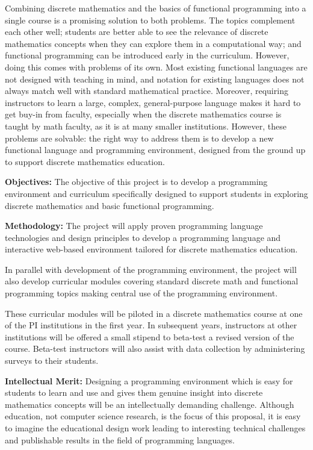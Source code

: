 Combining discrete mathematics and the basics of functional
programming into a single course is a promising solution to both
problems.  The topics complement each other well; students are better
able to see the relevance of discrete mathematics concepts when they
can explore them in a computational way; and functional programming
can be introduced early in the curriculum.  However, doing this comes
with problems of its own. Most existing functional languages are not
designed with teaching in mind, and notation for existing languages
does not always match well with standard mathematical practice.
Moreover, requiring instructors to learn a large, complex,
general-purpose language makes it hard to get buy-in from faculty,
especially when the discrete mathematics course is taught by math
faculty, as it is at many smaller institutions. However, these
problems are solvable: the right way to address them is to develop a
new functional language and programming environment, designed from the
ground up to support discrete mathematics education.

{\bf Objectives: } The objective of this project is to develop a
programming environment and curriculum specifically designed to
support students in exploring discrete mathematics and basic
functional programming.

{\bf Methodology: } The project will apply proven programming language
technologies and design principles to develop a programming language
and interactive web-based environment tailored for discrete
mathematics education.

In parallel with development of the programming environment, the
project will also develop curricular modules covering standard
discrete math and functional programming topics making central use of
the programming environment.

These curricular modules will be piloted in a discrete mathematics
course at one of the PI institutions in the first year.  In subsequent
years, instructors at other institutions will be offered a small
stipend to beta-test a revised version of the course.  Beta-test
instructors will also assist with data collection by administering
surveys to their students.

{\bf Intellectual Merit:} Designing a programming environment
which is easy for students to learn and use and gives them genuine
insight into discrete mathematics concepts will be an intellectually
demanding challenge.  Although education, not computer science
research, is the focus of this proposal, it is easy to imagine the
educational design work leading to interesting technical challenges
and publishable results in the field of programming languages.

